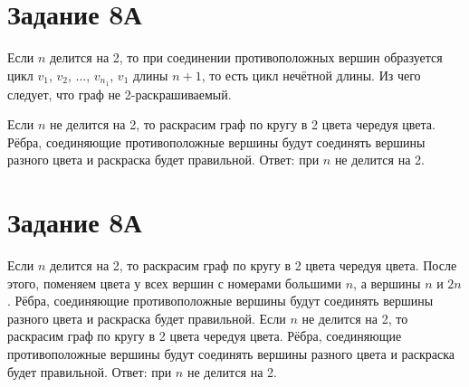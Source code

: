\documentclass[a4paper, 12pt]{article}
\begin{document}
	\section*{Задание 8А}
		Если $n$ делится на 2, то при соединении противоположных вершин образуется цикл $v_1$, $v_2$, ..., $v_n_1$, $v_1$ длины $n+1$, то есть цикл нечётной длины. Из чего следует, что граф не 2-раскрашиваемый.\par
		Если $n$ не делится на 2, то раскрасим граф по кругу в 2 цвета чередуя цвета. Рёбра, соединяющие противоположные вершины будут соединять вершины разного цвета и раскраска будет правильной.
		Ответ: при $n$ не делится на 2.
	\section*{Задание 8А}
		Если $n$ делится на 2, то раскрасим граф по кругу в 2 цвета чередуя цвета. После этого, поменяем цвета у всех вершин с номерами большими $n$, а вершины $n$ и $2n$. Рёбра, соединяющие противоположные вершины будут соединять вершины разного цвета и раскраска будет правильной.
		Если $n$ не делится на 2, то раскрасим граф по кругу в 2 цвета чередуя цвета. Рёбра, соединяющие противоположные вершины будут соединять вершины разного цвета и раскраска будет правильной.
		Ответ: при $n$ не делится на 2.
\end{document}
